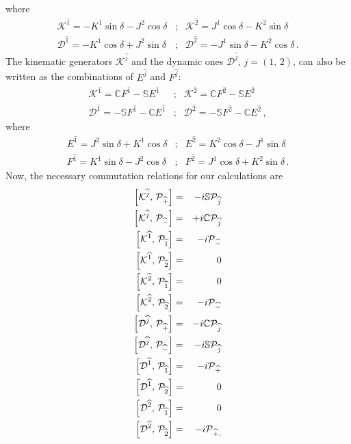 \documentclass[]{article}
\numberwithin{equation}{section}
\def\bea{\begin{eqnarray}}
\def\eea{\end{eqnarray}}
\def\wh{\widehat}
\begin{document}
{{where 
\bea
\label{generators3}
{\mathcal K}^{\wh1}  =  -K^1\sin\delta-J^2\cos\delta & ; & {\mathcal K}^{\wh 2}  =  J^1\cos\delta-K^2\sin\delta  \nonumber \\
{\mathcal D}^{\wh1}  =  -K^1\cos\delta+J^2\sin\delta & ; & {\mathcal D}^{\wh2}  =  -J^1\sin\delta-K^2\cos\delta \, .  
\eea
The kinematic generators ${\mathcal K}^{\wh j}$ and the dynamic ones ${\mathcal D}^{\wh j}, \, j=(1,\,2)$, can also be written as the combinations of $E^{\wh j}$ and $F^{\wh j}$:
\bea
\label{generators1}
{\mathcal K}^{\wh 1}  =  {\mathbb C}F^{\wh 1} - {\mathbb S}E^{\wh 1} & ; &  {\mathcal K}^{\wh 2} =  {\mathbb C}F^{\wh 2} - {\mathbb S}E^{\wh 2} \nonumber \\
{\mathcal D}^{\wh 1}  =  -{\mathbb S}F^{\wh 1} - {\mathbb C}E^{\wh 1} & ; &  {\mathcal D}^{\wh 2}  =  -{\mathbb S}F^{\wh 2} - {\mathbb C}E^{\wh 2}\, ,
\eea
where
\bea
\label{generators2}
E^{\wh 1}  =  J^2\sin\delta+K^1\cos\delta & ; & E^{\wh 2}  =  K^2\cos\delta-J^1\sin\delta \nonumber\\
F^{\wh 1}  =  K^1\sin\delta-J^2\cos\delta & ; & F^{\wh 2}  =  J^1\cos\delta+K^2\sin\delta \, . 
\eea
Now, the necessary commutation relations for our calculations are
\bea
\left[{\mathcal K}^{\wh{j}}, \, {\mathcal P}_{\wh{+}}\right] & = & -i{\mathbb S}\mathcal P}_{\wh{j}\\
\left[{\mathcal K}^{\wh{j}}, \, {\mathcal P}_{\wh{-}}\right] & = & +i{\mathbb C}\mathcal P}_{\wh{j}\\
\left[{\mathcal K}^{\wh{1}}, \, {\mathcal P}_{\wh{1}}\right] & = & -i\mathcal P}_{\wh{-}\\
\left[{\mathcal K}^{\wh{1}}, \, {\mathcal P}_{\wh{2}}\right] & = & 0\\
\left[{\mathcal K}^{\wh{2}}, \, {\mathcal P}_{\wh{1}}\right] & = & 0\\
\left[{\mathcal K}^{\wh{2}}, \, {\mathcal P}_{\wh{2}}\right] & = & -i\mathcal P}_{\wh{-}\\
\left[{\mathcal D}^{\wh{j}}, \, {\mathcal P}_{\wh{+}}\right] & = & -i{\mathbb C}\mathcal P}_{\wh{j}\\
\left[{\mathcal D}^{\wh{j}}, \, {\mathcal P}_{\wh{-}}\right] & = & -i{\mathbb S}\mathcal P}_{\wh{j}\\
\left[{\mathcal D}^{\wh{1}}, \, {\mathcal P}_{\wh{1}}\right] & = & -i\mathcal P}_{\wh{+}\\
\left[{\mathcal D}^{\wh{1}}, \, {\mathcal P}_{\wh{2}}\right] & = & 0\\
\left[{\mathcal D}^{\wh{2}}, \, {\mathcal P}_{\wh{1}}\right] & = & 0\\
\left[{\mathcal D}^{\wh{2}}, \, {\mathcal P}_{\wh{2}}\right] & = & -i\mathcal P}_{\wh{+}.
\eea



}}
\end{document}
